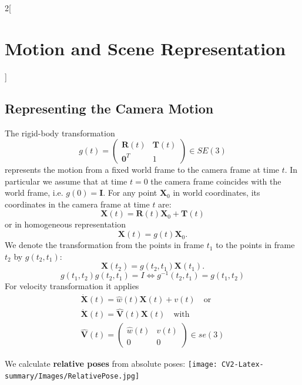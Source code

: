 \documentclass[oneside,fontsize=11pt,paper=a4]{scrartcl}
\begin{document}
\begin{multicols}{2}[\section{Motion and Scene Representation}]
\subsection{Representing the Camera Motion}
The rigid-body transformation
\begin{equation*}
    g(t) = \begin{pmatrix} \mathbf{R}(t) & \mathbf{T}(t)\\\mathbf{0}^T & 1 \end{pmatrix} \in SE(3)
\end{equation*}
represents the motion from a fixed world frame to the camera frame at time $t$.
In particular we assume that at time $t = 0$ the camera frame coincides with the world frame, i.e. $g(0) = \mathbf{I}$.
For any point $\mathbf{X}_0$ in world coordinates, its coordinates in the camera frame at time $t$ are:
\begin{equation*}
    \mathbf{X}(t) = \mathbf{R}(t)\mathbf{X}_0 + \mathbf{T}(t)
\end{equation*}
or in homogeneous representation
\begin{equation*}
    \mathbf{X}(t) = g(t)\mathbf{X}_0.
\end{equation*}
We denote the transformation from the points in frame $t_1$ to the points in frame $t_2$ by $g(t_2,t_1)$:
\begin{equation*}
    \mathbf{X}(t_2) = g(t_2, t_1)\mathbf{X}(t_1).
\end{equation*}
\begin{equation*}
    g(t_1, t_2)g(t_2, t_1) = I \Leftrightarrow g^{-1}(t_2, t_1) = g(t_1, t_2)
\end{equation*}
For velocity transformation it applies
\begin{equation*}
    \begin{split}
        \mathbf{\dot{X}}(t) = \hat{w}(t)\mathbf{X}(t) + v(t) \quad \text{or} \\ \mathbf{\dot{X}}(t) = \mathbf{\hat{V}}(t)\mathbf{X}(t) \quad \text{with} \\ \mathbf{\hat{V}}(t) = \begin{pmatrix}\hat{w}(t) & v(t)\\0 & 0 \end{pmatrix} \in se(3)
    \end{split}
\end{equation*}

\begin{center}
    We calculate \textbf{relative poses} from absolute poses:
    \texttt{[image: CV2-Latex-summary/Images/RelativePose.jpg]}
\end{center}


\end{multicols}
\end{document}

